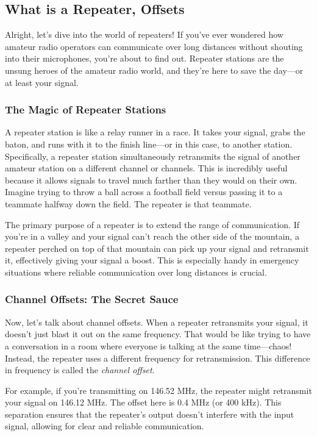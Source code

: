 \subsection{What is a Repeater, Offsets}
\label{subsec:repeater-basics}

Alright, let’s dive into the world of repeaters! If you’ve ever wondered how amateur radio operators can communicate over long distances without shouting into their microphones, you’re about to find out. Repeater stations are the unsung heroes of the amateur radio world, and they’re here to save the day—or at least your signal.

\subsubsection*{The Magic of Repeater Stations}

A repeater station is like a relay runner in a race. It takes your signal, grabs the baton, and runs with it to the finish line—or in this case, to another station. Specifically, a repeater station simultaneously retransmits the signal of another amateur station on a different channel or channels. This is incredibly useful because it allows signals to travel much farther than they would on their own. Imagine trying to throw a ball across a football field versus passing it to a teammate halfway down the field. The repeater is that teammate.

The primary purpose of a repeater is to extend the range of communication. If you’re in a valley and your signal can’t reach the other side of the mountain, a repeater perched on top of that mountain can pick up your signal and retransmit it, effectively giving your signal a boost. This is especially handy in emergency situations where reliable communication over long distances is crucial.

\subsubsection*{Channel Offsets: The Secret Sauce}

Now, let’s talk about channel offsets. When a repeater retransmits your signal, it doesn’t just blast it out on the same frequency. That would be like trying to have a conversation in a room where everyone is talking at the same time—chaos! Instead, the repeater uses a different frequency for retransmission. This difference in frequency is called the \textit{channel offset}.

For example, if you’re transmitting on 146.52 MHz, the repeater might retransmit your signal on 146.12 MHz. The offset here is 0.4 MHz (or 400 kHz). This separation ensures that the repeater’s output doesn’t interfere with the input signal, allowing for clear and reliable communication.

